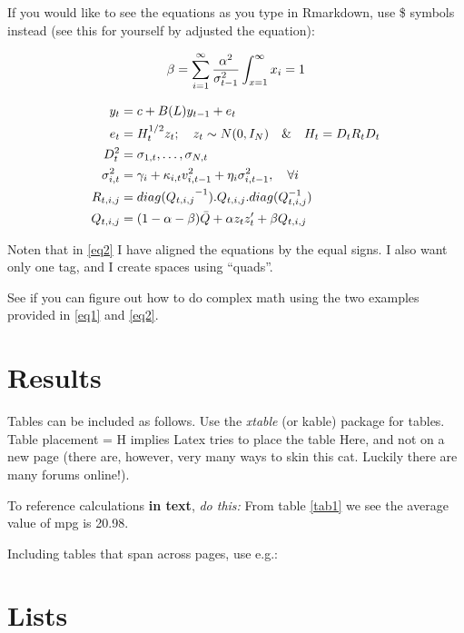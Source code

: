 \documentclass[12pt,a4paper]{article}
\numberwithin{equation}{section}
\numberwithin{figure}{section}
\numberwithin{table}{section}
\begin{document}
If you would like to see the equations as you type in Rmarkdown, use \$
symbols instead (see this for yourself by adjusted the equation):

\[
\beta = \sum_{i = 1}^{\infty}\frac{\alpha^2}{\sigma_{t-1}^2} \\ 
\int_{x = 1}^{\infty}x_{i} = 1
\]

\begin{align} 
    y_t &= c + B(L) y_{t-1} + e_t   \label{eq2}    \\ \notag 
    e_t &= H_t^{1/2}  z_t ; \quad z_t \sim  N(0,I_N) \quad \& \quad H_t = D_tR_tD_t \\ \notag
        D_t^2 &= {\sigma_{1,t}, \dots, \sigma_{N,t}}   \\ \notag
        \sigma_{i,t}^2 &= \gamma_i+\kappa_{i,t}  v_{i, t-1}^2 +\eta_i  \sigma_{i, t-1}^2, \quad \forall i \\ \notag
        R_{t, i, j} &= {diag(Q_{t, i, j}}^{-1}) . Q_{t, i, j} . diag(Q_{t, i, j}^{-1})  \\ \notag
        Q_{t, i, j} &= (1-\alpha-\beta)  \bar{Q} + \alpha  z_t  z_t'  + \beta  Q_{t, i, j} \notag
\end{align}

Noten that in \ref{eq2} I have aligned the equations by the equal signs.
I also want only one tag, and I create spaces using ``quads''.

See if you can figure out how to do complex math using the two examples
provided in \ref{eq1} and \ref{eq2}.

\section{Results}\label{results}

Tables can be included as follows. Use the \emph{xtable} (or kable)
package for tables. Table placement = H implies Latex tries to place the
table Here, and not on a new page (there are, however, very many ways to
skin this cat. Luckily there are many forums online!).

To reference calculations \textbf{in text}, \emph{do this:} From table
\ref{tab1} we see the average value of mpg is 20.98.

Including tables that span across pages, use e.g.:

\hfill

\section{Lists}\label{lists}
\end{document}
